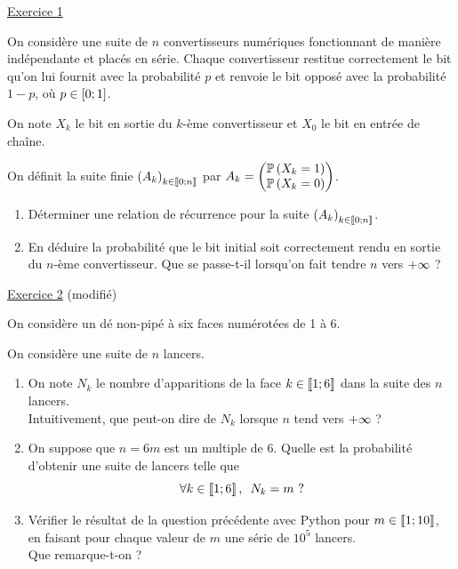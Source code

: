 \begin{exo}
\underline{Exercice 1}

On considère une suite de \(n\) convertisseurs numériques fonctionnant de manière indépendante et placés en série. Chaque convertisseur restitue correctement le bit qu'on lui fournit avec la probabilité \(p\) et renvoie le bit opposé avec la probabilité \(1-p\), où \(p\in\left[0;1\right]\).

On note \(X_k\) le bit en sortie du \(k\)-ème convertisseur et \(X_0\) le bit en entrée de chaîne.

On définit la suite finie \(\left(A_k\right)_{k\in\left\llbracket0;n\right\rrbracket}\) par \(A_k=\begin{pmatrix}\mathbb{P}\left(X_k=1\right)\\\mathbb{P}\left(X_k=0\right)\end{pmatrix}\).

\begin{enumerate}
    \item Déterminer une relation de récurrence pour la suite \(\left(A_k\right)_{k\in\left\llbracket0;n\right\rrbracket}\). \\
    \item En déduire la probabilité que le bit initial soit correctement rendu en sortie du \(n\)-ème convertisseur. Que se passe-t-il lorsqu'on fait tendre \(n\) vers \(+\infty\) ?
\end{enumerate}

\underline{Exercice 2} (modifié)

On considère un dé non-pipé à six faces numérotées de 1 à 6.

On considère une suite de \(n\) lancers.

\begin{enumerate}
    \item On note \(N_k\) le nombre d'apparitions de la face \(k\in\left\llbracket1;6\right\rrbracket\) dans la suite des \(n\) lancers. \\ Intuitivement, que peut-on dire de \(N_k\) lorsque \(n\) tend vers \(+\infty\) ? \\
    \item On suppose que \(n=6m\) est un multiple de \(6\). Quelle est la probabilité d'obtenir une suite de lancers telle que \[\quantifs{\forall k\in\interventierii{1}{6}}N_k=m\text{ ?}\]
    \item Vérifier le résultat de la question précédente avec Python pour \(m\in\left\llbracket1;10\right\rrbracket\), en faisant pour chaque valeur de \(m\) une série de \(10^5\) lancers. \\ Que remarque-t-on ?
\end{enumerate}
\end{exo}

